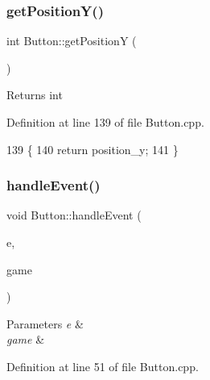 \subsubsection{\texorpdfstring{get\+Position\+Y()}{getPositionY()}}
{\footnotesize\ttfamily int Button\+::get\+PositionY (\begin{DoxyParamCaption}{ }\end{DoxyParamCaption})}

\begin{DoxyReturn}{Returns}
int 
\end{DoxyReturn}


Definition at line 139 of file Button.\+cpp.


\begin{DoxyCode}
139                          \{
140     \textcolor{keywordflow}{return} position\_y;
141 \}
\end{DoxyCode}
\mbox{\label{class_button_aa05597e01e195bb5901fc206bc0938a3}} 
\subsubsection{\texorpdfstring{handle\+Event()}{handleEvent()}}
{\footnotesize\ttfamily void Button\+::handle\+Event (\begin{DoxyParamCaption}\item[{S\+D\+L\+\_\+\+Event $\ast$}]{e,  }\item[{Game $\ast$}]{game }\end{DoxyParamCaption})}


\begin{DoxyParams}{Parameters}
{\em e} & \\
\hline
{\em game} & \\
\hline
\end{DoxyParams}


Definition at line 51 of file Button.\+cpp.


